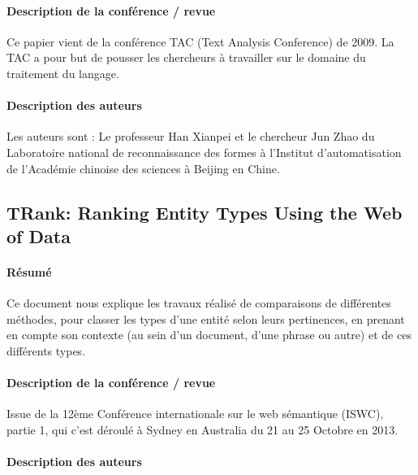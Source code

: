 \documentclass{article}
\begin{document}
\paragraph{Description de la conférence / revue}

Ce papier vient de la conférence TAC (Text Analysis Conference) de 2009. La TAC a pour but de pousser les chercheurs à travailler sur le domaine du traitement du langage.


\paragraph{Description des auteurs}

Les auteurs sont : Le professeur Han Xianpei et le chercheur Jun Zhao du Laboratoire national de reconnaissance des formes à l'Institut d'automatisation de l'Académie chinoise des sciences à Beijing en Chine.

\subsection{TRank: Ranking Entity Types Using the Web of Data\cite{article-11}}

\paragraph{Résumé}

Ce document nous explique les travaux réalisé de comparaisons de différentes méthodes, pour classer les types d'une entité selon leurs pertinences, en prenant en compte son contexte (au sein d'un document, d'une phrase ou autre) et de ces différents types.


\paragraph{Description de la conférence / revue}

Issue de la 12ème Conférence internationale sur le web sémantique (ISWC), partie 1, qui c'est déroulé à Sydney en Australia du 21 au 25 Octobre en 2013.


\paragraph{Description des auteurs}
\end{document}
